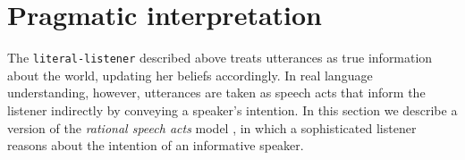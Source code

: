 \documentclass[12pt]{article}
\begin{document}
%

        
%



\section{Pragmatic interpretation}

The \lstinline{literal-listener} described above treats utterances as true information about the world, updating her beliefs accordingly. 
In real language understanding, however, utterances are taken as speech acts that inform the listener indirectly by conveying a speaker's intention. In this section we describe a version of the \emph{rational speech acts} model \cite{Goodman2013, Frank2012}, in which a sophisticated listener reasons about the intention of an informative speaker.
\end{document}
